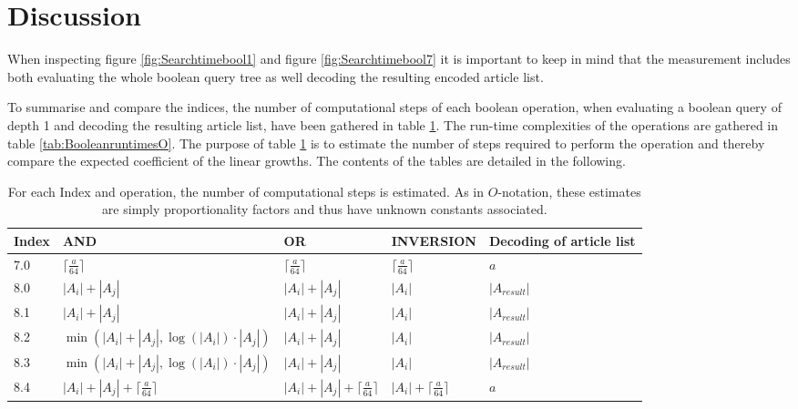 \section{Discussion}\label{sec:bool_discussion}
When inspecting figure \ref{fig:Searchtimebool1} and figure \ref{fig:Searchtimebool7} it is important to keep in mind that the measurement includes both evaluating the whole boolean query tree as well decoding the resulting encoded article list. 

To summarise and compare the indices, the number of computational steps of each boolean operation, when evaluating a boolean query of depth 1 and decoding the resulting article list, have been gathered in table \ref{tab:Booleanruntimes1}. The run-time complexities of the operations are gathered in table \ref{tab:BooleanruntimesO}. The purpose of table \ref{tab:Booleanruntimes1} is to estimate the number of steps required to perform the operation and thereby compare the expected coefficient of the linear growths. The contents of the tables are detailed in the following. 


\begin{table}[H]
\begin{tabular}{l|lllp{2cm}}
    Index & AND & OR & INVERSION & Decoding of article list\\
\hline
7.0 &  $\lceil \frac{a}{64} \rceil$   &  $\lceil \frac{a}{64} \rceil$  &  $\lceil \frac{a}{64} \rceil$ & $a$         \\
8.0 &  $|A_i| + |A_j|$   &  $|A_i| +|A_j|$  &  $|A_i|$  & $|A_{result}|$       \\
8.1 &  $|A_i| + |A_j|$   &  $|A_i| + |A_j|$  &  $|A_i|$  & $|A_{result}|$         \\
8.2 &  $\min(|A_i| + |A_j|, \log(|A_i|)\cdot |A_j|)$   &  $|A_i| + |A_j|$  &  $|A_i|$  & $|A_{result}|$    \\
8.3 &  $\min(|A_i| + |A_j|, \log(|A_i|)\cdot |A_j|)$   &  $|A_i| + |A_j|$  &  $|A_i|$  & $|A_{result}|$     \\
8.4 &  $|A_i| + |A_j| + \lceil \frac{a}{64} \rceil$   &   $|A_i| + |A_j| + \lceil \frac{a}{64} \rceil$   &  $|A_i| + \lceil \frac{a}{64} \rceil$   & $a$
\end{tabular}
\caption{For each Index and operation, the number of computational steps is estimated. As in $O$-notation, these estimates are simply proportionality factors and thus have unknown constants associated. }
\label{tab:Booleanruntimes1}
\end{table}

